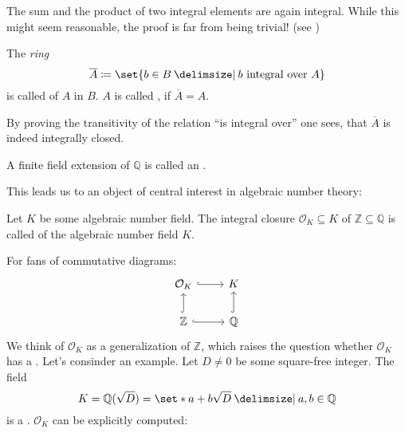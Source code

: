 \begin{remark}
	The sum and the product of two integral elements are again integral.
	While this might seem reasonable, the proof is far from being trivial! (see \textcite[Prop.~2.2]{neukirch})
\end{remark}

\begin{definition}[{name=[integral closure]}]
	The \emph{ring}
	\[
		\overline{A} \coloneqq \set{b \in B \given b \text{ integral over }A}
	\]
	is called  of $A$ in $B$.
	$A$ is called , if $\overline{A} = A$.
\end{definition}

By proving the transitivity of the relation \enquote{is integral over} one sees, that $\overline{A}$ is indeed integrally closed.

\begin{definition}[{name=[algebraic number field]}]
	A finite field extension of $\mathbb{Q}$ is called an .
\end{definition}

This leads us to an object of central interest in algebraic number theory:

\begin{definition}[{name=[ring of integers]}]
	Let $K$ be some algebraic number field.
	The integral closure $\mathcal{O}_K \subseteq K$ of $\mathbb{Z} \subseteq \mathbb{Q}$ is called  of the algebraic number field $K$.
\end{definition}

For fans of commutative diagrams:
\[
	\begin{tikzcd}
		\mathcal{O}_K \rar[hook] & K \\
		\mathbb{Z} \uar[hook] \rar[hook] & \mathbb{Q} \uar[hook]
	\end{tikzcd}
\]
We think of $\mathcal{O}_K$ as a generalization of $\mathbb{Z}$, which raises the question whether $\mathcal{O}_K$ has a . Let's consinder an example.
Let $D\neq 0$ be some square-free integer.
The field
\[
	K=\mathbb{Q}(\sqrt{D}) = \set*{a + b \sqrt{D} \given a,b \in \mathbb{Q}}
\]
is a . $\mathcal{O}_K$ can be explicitly computed:

